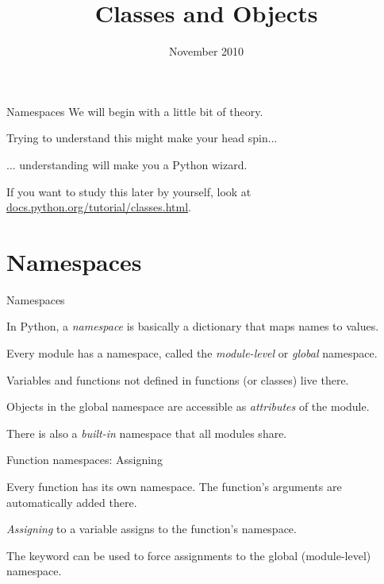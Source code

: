 \documentclass{pyslides}
\title{Classes and Objects}
\date{November 2010}
\begin{document}
\begin{frame}\titlepage\end{frame}

\section{}

\begin{frame}[fragile]{Namespaces}
We will begin with a little bit of theory.

\bigskip

Trying to understand this might make your head spin...

\hfill ... understanding will make you a Python wizard.

\bigskip

If you want to study this later by yourself, look at \href{http://docs.python.org/tutorial/classes.html}{docs.python.org/tutorial/classes.html}.
\end{frame}

\section{Namespaces}

\begin{frame}[fragile]{Namespaces}

In Python, a \emph{namespace} is basically a dictionary that maps names to values.

Every module has a namespace, called the \emph{module-level} or \emph{global} namespace.

Variables and functions not defined in functions (or classes) live there.

Objects in the global namespace are accessible as \emph{attributes} of the module.

There is also a \emph{built-in} namespace that all modules share.

\end{frame}


\begin{frame}[fragile]{Function namespaces: Assigning}

Every function has its own namespace. The function's arguments are automatically added there.

\emph{Assigning} to a variable assigns to the function's namespace.

The  keyword can be used to force assignments to the global (module-level) namespace.
\end{frame}
\end{document}
